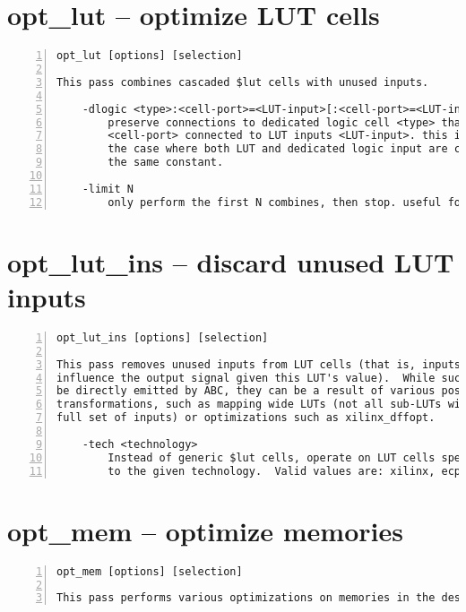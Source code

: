 \section{opt\_lut -- optimize LUT cells}
\label{cmd:opt_lut}
\begin{lstlisting}[numbers=left,frame=single]
    opt_lut [options] [selection]

This pass combines cascaded $lut cells with unused inputs.

    -dlogic <type>:<cell-port>=<LUT-input>[:<cell-port>=<LUT-input>...]
        preserve connections to dedicated logic cell <type> that has ports
        <cell-port> connected to LUT inputs <LUT-input>. this includes
        the case where both LUT and dedicated logic input are connected to
        the same constant.

    -limit N
        only perform the first N combines, then stop. useful for debugging.
\end{lstlisting}

\section{opt\_lut\_ins -- discard unused LUT inputs}
\label{cmd:opt_lut_ins}
\begin{lstlisting}[numbers=left,frame=single]
    opt_lut_ins [options] [selection]

This pass removes unused inputs from LUT cells (that is, inputs that can not
influence the output signal given this LUT's value).  While such LUTs cannot
be directly emitted by ABC, they can be a result of various post-ABC
transformations, such as mapping wide LUTs (not all sub-LUTs will use the
full set of inputs) or optimizations such as xilinx_dffopt.

    -tech <technology>
        Instead of generic $lut cells, operate on LUT cells specific
        to the given technology.  Valid values are: xilinx, ecp5, gowin.
\end{lstlisting}

\section{opt\_mem -- optimize memories}
\label{cmd:opt_mem}
\begin{lstlisting}[numbers=left,frame=single]
    opt_mem [options] [selection]

This pass performs various optimizations on memories in the design.
\end{lstlisting}

